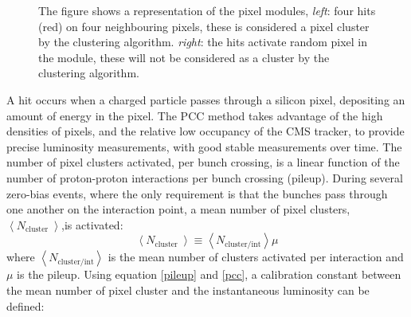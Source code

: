 \begin{figure}[H]
\begin{minipage}[b]{0.5\linewidth}
\centering
{}
\end{minipage}
\begin{minipage}[b]{0.5\linewidth}
\centering
{}
\end{minipage}
\caption[Pixel cluster selection algorithm]{The figure shows a representation of the pixel modules, \textit{left}: four hits (red) on four neighbouring pixels, these is considered a pixel cluster by the clustering algorithm. \textit{right}: the hits activate random pixel in the module, these will not be considered as a cluster by the clustering algorithm.}
\label{pixclust}
\end{figure}
A hit occurs when a charged particle passes through a silicon pixel, depositing an amount of energy in the pixel. The PCC method takes advantage of the high densities of pixels, and the relative low occupancy of the CMS tracker, to provide precise luminosity measurements, with good stable measurements over time. The number of pixel clusters activated, per bunch crossing, is a linear function of the number of proton-proton interactions per bunch crossing (pileup). During several zero-bias events, where the only requirement is that the bunches pass through one another on the interaction point, a mean number of pixel clusters, $\left\langle N_{\text {cluster }}\right\rangle
$,is activated:
\begin{equation}
\left\langle N_{\text {cluster }}\right\rangle\equiv\left\langle N_{\text {cluster/int}}\right\rangle\mu
\label{pcc}
\end{equation}
where $\left\langle N_{\text {cluster/int}}\right\rangle$ is the mean number of clusters activated per interaction and $\mu$ is the pileup. Using equation \ref{pileup} and \ref{pcc}, a calibration constant between the mean number of pixel cluster and the instantaneous luminosity can be defined:

